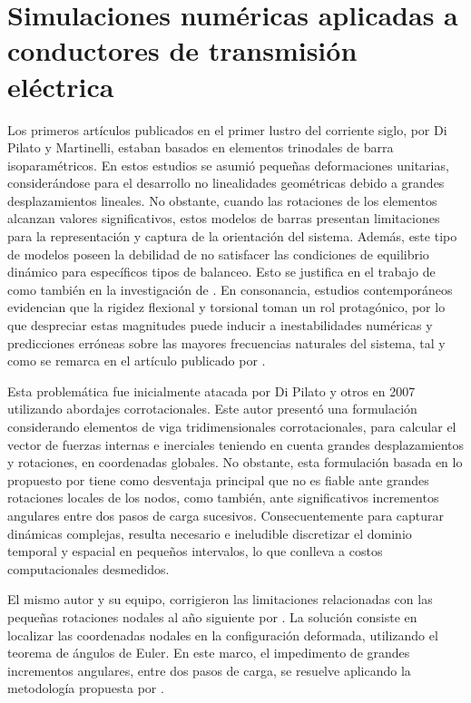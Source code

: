 \section{Simulaciones numéricas aplicadas a conductores de transmisión eléctrica}\label{Sec:EA:AplicadasConductores}
Los primeros artículos publicados en el primer lustro del corriente siglo, por Di Pilato y Martinelli, estaban basados en elementos trinodales de barra isoparamétricos. En estos estudios se asumió pequeñas deformaciones unitarias, considerándose para el desarrollo no linealidades geométricas debido a grandes desplazamientos lineales. No obstante, cuando las rotaciones de los elementos alcanzan valores significativos, estos modelos de barras presentan limitaciones para la representación y captura de la orientación del sistema. Además, este tipo de modelos poseen la debilidad de no satisfacer las condiciones de equilibrio dinámico para específicos tipos de balanceo. Esto se justifica en el trabajo de \cite{martinelli2001numerical} como también en la investigación de \cite{Martinelli2004}. En consonancia, estudios contemporáneos evidencian que la rigidez flexional y torsional toman un rol protagónico, por lo que despreciar estas magnitudes puede inducir a inestabilidades numéricas y predicciones erróneas sobre las mayores frecuencias naturales del sistema, tal y como se remarca en el artículo publicado por \cite{koh2004dynamic}.

Esta problemática fue inicialmente atacada por Di Pilato y otros en 2007 utilizando abordajes corrotacionales. Este autor presentó una formulación considerando elementos de viga tridimensionales corrotacionales, para calcular el vector de fuerzas internas e inerciales teniendo en cuenta grandes desplazamientos y rotaciones, en coordenadas globales. No obstante, esta formulación basada en lo propuesto por \cite{oran1973tangent} tiene como desventaja principal que no es fiable ante grandes rotaciones locales de los nodos, como también, ante significativos incrementos angulares entre dos pasos de carga sucesivos. Consecuentemente para capturar dinámicas complejas, resulta necesario e ineludible discretizar el dominio temporal y espacial en pequeños intervalos, lo que conlleva a costos computacionales desmedidos.

El mismo autor y su equipo, corrigieron las limitaciones relacionadas con las pequeñas rotaciones nodales al año siguiente por \cite{di2008corotational}. La solución consiste en localizar las coordenadas nodales en la configuración deformada, utilizando el teorema de ángulos de Euler. En este marco, el impedimento de grandes incrementos angulares, entre dos pasos de carga, se resuelve aplicando la metodología propuesta por \cite{simo1988dynamics}.  


